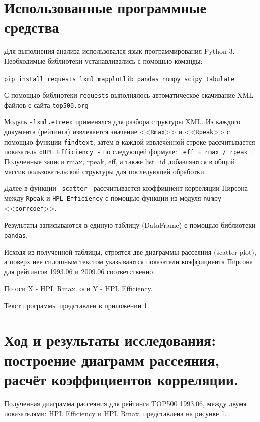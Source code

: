 \documentclass[14pt,a4paper]{extarticle}
\begin{document}
\section{Использованные программные средства}
Для выполнения анализа использовался язык программирования Python 3.
Необходимые библиотеки устанавливались с помощью команды:

\begin{sloppypar}
\texttt {pip install requests lxml mapplotlib pandas numpy scipy tabulate}
\end{sloppypar}

\begin{sloppypar}
С помощью библиотеки \texttt{requests} выполнялось автоматическое скачивание XML-файлов с сайта \texttt{top500.org}

Модуль «\texttt{lxml.etree}» применялся для разбора структуры XML.
Из каждого документа (рейтинга) извлекается значение <<\texttt{Rmax}>> и <<\texttt{Rpeak}>>
с помощью функции \texttt{findtext}, затем в каждой извлечённой строке
рассчитывается показатель «\texttt{HPL Efficiency }» по следующей формуле:
\texttt{ eff = rmax / rpeak }. Полученные записи rmax, rpeak, eff, а также list\_id добавляются в общий массив пользовательской
структуры для последующей обработки.

Далее в функции \texttt{ scatter } рассчитывается коэффициент корреляции Пирсона между \texttt{Rpeak} и \texttt{HPL Efficiency} с помощью
функции из модуля \texttt{numpy} <<\texttt{corrcoef}>>.

Результаты записываются в единую таблицу (DataFrame) с помощью библиотеки \texttt{pandas}.

Исходя из полученной таблицы, строятся две диаграммы рассеяния (scatter plot),
а поверх нее сплошным текстом указываются показатели коэффициента Пирсона для
рейтингов 1993.06 и 2009.06 соответственно.
\end{sloppypar}

По оси X - HPL Rmax.
 оси Y - HPL Efficiency.

Текст программы представлен в приложении 1.

\newpage
\section{Ход и результаты исследования: построение диаграмм рассеяния, расчёт
коэффициентов корреляции.}
    Полученная диаграмма рассеяния для рейтинга TOP500 1993.06, между двумя
    показателями: HPL Efficiency и HPL Rmax, представлена на рисунке 1.
\end{document}
